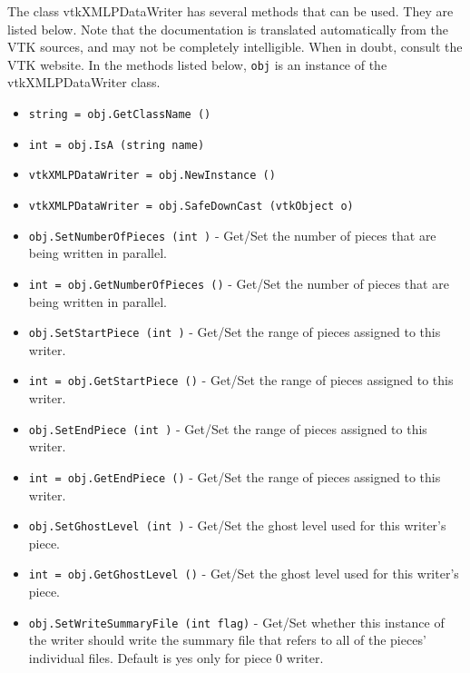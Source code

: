 The class vtkXMLPDataWriter has several methods that can be used.
  They are listed below.
Note that the documentation is translated automatically from the VTK sources,
and may not be completely intelligible.  When in doubt, consult the VTK website.
In the methods listed below, \verb|obj| is an instance of the vtkXMLPDataWriter class.
\begin{itemize}
\item  \verb|string = obj.GetClassName ()|

\item  \verb|int = obj.IsA (string name)|

\item  \verb|vtkXMLPDataWriter = obj.NewInstance ()|

\item  \verb|vtkXMLPDataWriter = obj.SafeDownCast (vtkObject o)|

\item  \verb|obj.SetNumberOfPieces (int )| -  Get/Set the number of pieces that are being written in parallel.

\item  \verb|int = obj.GetNumberOfPieces ()| -  Get/Set the number of pieces that are being written in parallel.

\item  \verb|obj.SetStartPiece (int )| -  Get/Set the range of pieces assigned to this writer.

\item  \verb|int = obj.GetStartPiece ()| -  Get/Set the range of pieces assigned to this writer.

\item  \verb|obj.SetEndPiece (int )| -  Get/Set the range of pieces assigned to this writer.

\item  \verb|int = obj.GetEndPiece ()| -  Get/Set the range of pieces assigned to this writer.

\item  \verb|obj.SetGhostLevel (int )| -  Get/Set the ghost level used for this writer's piece.

\item  \verb|int = obj.GetGhostLevel ()| -  Get/Set the ghost level used for this writer's piece.

\item  \verb|obj.SetWriteSummaryFile (int flag)| -  Get/Set whether this instance of the writer should write the
 summary file that refers to all of the pieces' individual files.
 Default is yes only for piece 0 writer.


\end{itemize}

